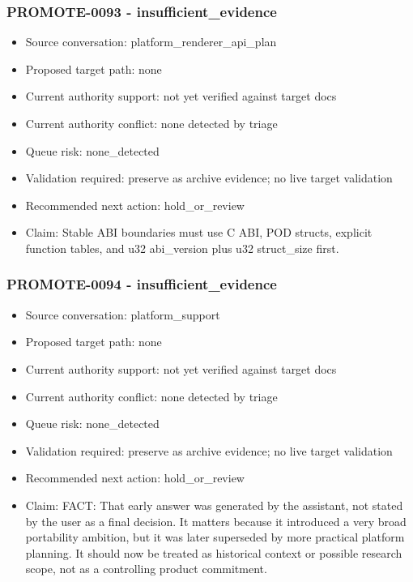 \documentclass[11pt,a4paper]{report}
\begin{document}
\subsubsection{PROMOTE-0093 - insufficient\_evidence}

\begin{itemize}
\item Source conversation: platform\_renderer\_api\_plan
\item Proposed target path: none
\item Current authority support: not yet verified against target docs
\item Current authority conflict: none detected by triage
\item Queue risk: none\_detected
\item Validation required: preserve as archive evidence; no live target validation
\item Recommended next action: hold\_or\_review
\item Claim: Stable ABI boundaries must use C ABI, POD structs, explicit function tables, and u32 abi\_version plus u32 struct\_size first.
\end{itemize}

\subsubsection{PROMOTE-0094 - insufficient\_evidence}

\begin{itemize}
\item Source conversation: platform\_support
\item Proposed target path: none
\item Current authority support: not yet verified against target docs
\item Current authority conflict: none detected by triage
\item Queue risk: none\_detected
\item Validation required: preserve as archive evidence; no live target validation
\item Recommended next action: hold\_or\_review
\item Claim: FACT: That early answer was generated by the assistant, not stated by the user as a final decision. It matters because it introduced a very broad portability ambition, but it was later superseded by more practical platform planning. It should now be treated as historical context or possible research scope, not as a controlling product commitment.
\end{itemize}
\end{document}
